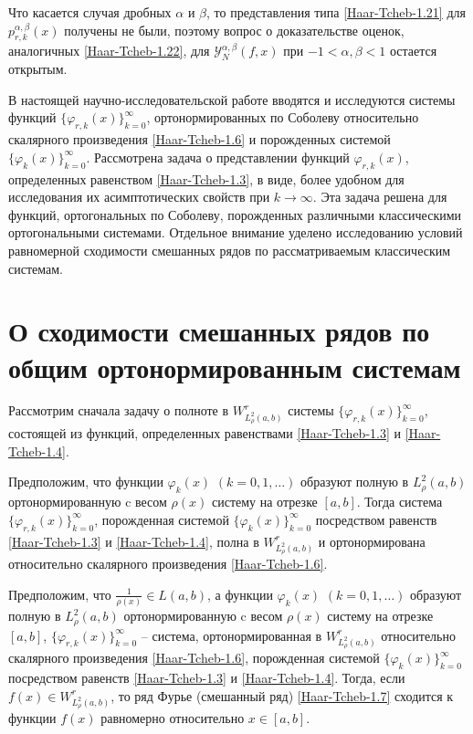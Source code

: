 Что касается случая дробных $\alpha$ и $\beta$, то представления типа \eqref{Haar-Tcheb-1.21} для
$p_{r,k}^{\alpha,\beta}(x)$ получены не были, поэтому вопрос о доказательстве оценок, аналогичных \eqref{Haar-Tcheb-1.22}, для $\mathcal{Y}_N^{\alpha,\beta}(f,x)$ при
$-1<\alpha,\beta<1$ остается открытым.



В настоящей научно-исследовательской работе вводятся и исследуются системы функций $\{\varphi_{r,k}(x)\}_{k=0}^\infty$, ортонормированных по Соболеву относительно скалярного произведения \eqref{Haar-Tcheb-1.6} и порожденных системой $\{\varphi_{k}(x)\}_{k=0}^\infty$. Рассмотрена задача о представлении функций $\varphi_{r,k}(x)$, определенных равенством \eqref{Haar-Tcheb-1.3}, в виде, более удобном для исследования их асимптотических свойств при $k\to\infty$. Эта задача решена для функций, ортогональных по Соболеву, порожденных различными классическими ортогональными системами. Отдельное внимание уделено исследованию условий равномерной сходимости смешанных рядов по рассматриваемым классическим системам.

\section{ О сходимости смешанных рядов  по общим ортонормированным системам }

Рассмотрим сначала задачу о полноте в $W^r_{L^2_\rho(a,b)}$ системы $\{\varphi_{r,k}(x)\}_{k=0}^\infty$, состоящей из функций, определенных равенствами   \eqref{Haar-Tcheb-1.3} и \eqref{Haar-Tcheb-1.4}.
\begin{theorem}\label{completeness}
Предположим, что    функции $\varphi_k(x)$ $(k=0,1,\ldots)$ образуют полную в $L^2_\rho(a,b)$ ортонормированную   c весом   $\rho(x)$ систему на отрезке $[a,b]$. Тогда система $\{\varphi_{r,k}(x)\}_{k=0}^\infty$, порожденная системой $\{\varphi_{k}(x)\}_{k=0}^\infty$ посредством равенств \eqref{Haar-Tcheb-1.3} и \eqref{Haar-Tcheb-1.4}, полна  в $W^r_{L^2_\rho(a,b)}$ и ортонормирована относительно скалярного произведения \eqref{Haar-Tcheb-1.6}.
\end{theorem}


\begin{theorem}\label{uni-conv}
Предположим, что  $ \frac{1}{\rho(x)}\in L(a,b) $, а  функции $\varphi_k(x)$ $(k=0,1,\ldots)$  образуют полную в $L^2_\rho(a,b)$ ортонормированную   c весом   $\rho(x)$ систему на отрезке $[a,b]$, $\{\varphi_{r,k}(x)\}_{k=0}^\infty$ -- система, ортонормированная в $W^r_{L^2_\rho(a,b)}$ относительно скалярного произведения \eqref{Haar-Tcheb-1.6},  порожденная системой $\{\varphi_{k}(x)\}_{k=0}^\infty$ посредством равенств \eqref{Haar-Tcheb-1.3} и \eqref{Haar-Tcheb-1.4}.
Тогда, если $f(x)\in W^r_{L^2_\rho(a,b)}$, то ряд Фурье (смешанный ряд) \eqref{Haar-Tcheb-1.7} сходится к функции $f(x)$ равномерно относительно $x\in[a,b]$.
\end{theorem}

